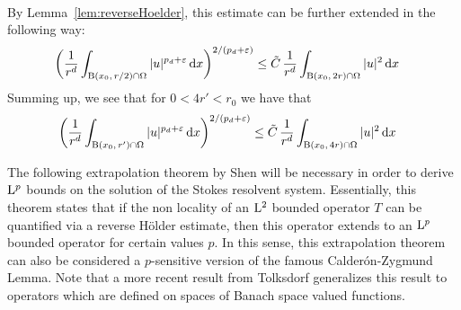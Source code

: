 \begin{rem}
\begin{align*}
    \end{align*}
    By Lemma~\ref{lem:reverseHoelder}, this estimate can be further extended in the following way:
    \begin{align*}
      \bigg( \frac{1}{r^d} \int_{\BB(x_0,\, r/2) \cap \Omega} |u|^{p_d + \varepsilon}\d x \bigg)^{2/(p_d + \varepsilon)} 
      &\leq \tilde C\, \frac{1}{r^d} \int_{\BB(x_0,\, 2 r) \cap \Omega} |u|^2 \d x %
    \end{align*}
    Summing up, we see that for $0 < 4 r' < r_0$ we have that
    \begin{align}
      \label{eq:improvedreverseHoelder}
      \bigg( \frac{1}{r^d} \int_{\BB(x_0,\, r') \cap \Omega} |u|^{p_d + \varepsilon}\d x \bigg)^{2/(p_d + \varepsilon)} 
      &\leq \tilde C\, \frac{1}{r^d} \int_{\BB(x_0,\, 4 r) \cap \Omega} |u|^2 \d x %
    \end{align}
  \end{rem}



The following extrapolation theorem by Shen \cite[Thm.\@~3.3]{shenExtra} will be necessary in order to derive $\mathrm{L}^p$ bounds on the solution of the Stokes resolvent system.
Essentially, this theorem states that if the non locality of an $\mathrm{L}^2$ bounded operator  $T$ can be quantified via a reverse Hölder estimate, then this operator extends to an $\mathrm{L}^p$ bounded operator for certain values $p$.
In this sense, this extrapolation theorem can also be considered a $p$-sensitive version of the famous Calder\'on-Zygmund Lemma.
Note that a more recent result from Tolksdorf \cite[Thm.\@~4.1]{tolksdorf2017} generalizes this result to operators which are defined on spaces of Banach space valued functions.

